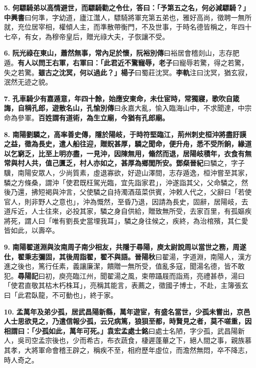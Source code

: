 \textbf{5.} \textbf{何驃騎弟以高情避世，而驃騎勸之令仕，答曰：「予第五之名，何必減驃騎？」}{\footnotesize \textbf{中興書}曰何準，字幼道，廬江灊人，驃騎將軍充第五弟也，雅好高尚，徵聘一無所就，充位居宰相，權傾人主，而準散帶衡門，不及世事，于時名德皆稱之，年四十七卒，有女，為穆帝皇后，贈光祿大夫，子恢讓不受。}

\textbf{6.} \textbf{阮光祿在東山，蕭然無事，常內足於懷，}{\footnotesize \textbf{阮裕別傳}曰裕居會稽剡山，志存肥遁。}\textbf{有人以問王右軍，右軍曰：「此君近不驚寵辱，}{\footnotesize \textbf{老子}曰寵辱若驚，得之若驚，失之若驚。}\textbf{雖古之沈冥，何以過此？」}{\footnotesize \textbf{楊子}曰蜀莊沈冥。\textbf{李軌}注曰沈冥，猶玄寂，泯然无迹之貌。}

\textbf{7.} \textbf{孔車騎少有嘉遁意，年四十餘，始應安東命，未仕宦時，常獨寢，歌吹自箴誨，自稱孔郎，遊散名山，}{\footnotesize \textbf{孔愉別傳}曰永嘉大亂，愉入臨海山中，不求聞達，中宗命為參軍。}\textbf{百姓謂有道術，為生立廟，今猶有孔郎廟。}

\textbf{8.} \textbf{南陽劉驎之，高率善史傳，隱於陽岐，于時符堅臨江，荊州刺史桓沖將盡訏謨之益，徵為長史，遣人船往迎，贈貺甚厚，驎之聞命，便升舟，悉不受所餉，緣道以乞窮乏，比至上明亦盡，一見沖，因陳無用，翛然而退，居陽岐積年，衣食有無常與村人共，值己匱乏，村人亦如之，甚厚為鄉閭所安。}{\footnotesize \textbf{鄧粲晉紀}曰驎之，字子驥，南陽安眾人，少尚質素，虛退寡欲，好遊山澤間，志存遁逸，桓沖嘗至其家，驎之方條桑，謂沖「使君既枉駕光臨，宜先詣家君」，沖遂詣其父，父命驎之，然後乃還，拂短褐與沖言，父使驎之自持濁酒葅菜供賓，沖敕人代之，父辭曰「若使官人，則非野人之意也」，沖為慨然，至昏乃退，因請為長史，固辭，居陽岐，去道斥近，人士往來，必投其家，驎之身自供給，贈致無所受，去家百里，有孤嫗疾將死，謂人曰「唯有劉長史當埋我耳」，驎之身往候之，疾終，為治棺殯，其仁愛皆如此，以壽卒。}

\textbf{9.} \textbf{南陽翟道淵與汝南周子南少相友，共隱于尋陽，庾太尉說周以當世之務，周遂仕，翟秉志彌固，其後周詣翟，翟不與語。}{\footnotesize \textbf{晉陽秋}曰翟湯，字道淵，南陽人，漢方進之後也，篤行任素，義讓廉潔，饋贈一無所受，值亂多寇，聞湯名德，皆不敢犯。\textbf{尋陽記}曰初，庾亮臨江州，聞翟湯之風，束帶躡屐而詣焉，亮禮甚恭，湯曰「使君直敬其枯木朽株耳」，亮稱其能言，表薦之，徵國子博士，不赴，主簿張玄曰「此君臥龍，不可動也」，終于家。}

\textbf{10.} \textbf{孟萬年及弟少孤，居武昌陽新縣，萬年遊宦，有盛名當世，少孤未嘗出，京邑人士思欲見之，乃遣信報少孤，云兄病篤，狼狽至都，時賢見之者，莫不嗟重，因相謂曰：「少孤如此，萬年可死。」}{\footnotesize \textbf{袁宏孟處士銘}曰處士名陋，字少孤，武昌陽新人，吳司空孟宗後也，少而希古，布衣蔬食，棲遲蓬蓽之下，絕人間之事，親族慕其孝，大將軍命會稽王辟之，稱疾不至，相府歷年虛位，而澹然無悶，卒不降志，時人奇之。}

